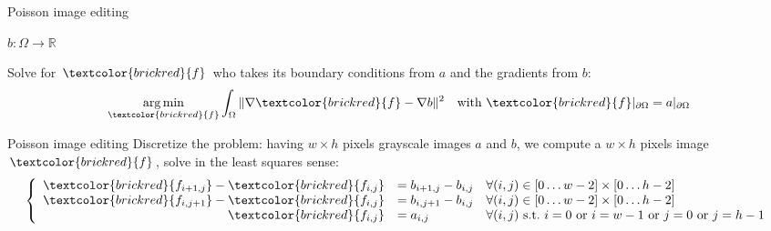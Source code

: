 \documentclass[UKenglish,aspectratio=169]{beamer}
\DeclareMathOperator*{\argmin}{arg\,min}
\newcommand\unknown[1]{\textcolor{brickred}{#1}}
\begin{document}
\begin{frame}{Poisson image editing}
\begin{minipage}{.12\linewidth}
$b:\Omega\rightarrow \mathbb R$
\end{minipage}
\qquad
\pause
\begin{minipage}{.6\linewidth}
Solve for $\unknown{f}$ who takes its boundary conditions from $a$ and the gradients from $b$:
$$
\argmin\limits_{\unknown{f}} \int_\Omega \|\nabla \unknown{f} - \nabla b\|^2 \quad \text{with~} \unknown{f}|_{\partial\Omega} = a|_{\partial\Omega}
$$
\end{minipage}
\end{frame}

\begin{frame}{Poisson image editing}
Discretize the problem: having $w \times h$ pixels grayscale images $a$ and $b$,
we compute a $w \times h$ pixels image $\unknown{f}$, solve in the least squares sense:
$$
\left \{ \begin{array}{rll}
\unknown{f_{i+1, j}}-\unknown{f_{i,j}} & = b_{i+1, j}-b_{i,j} & \forall (i,j) \in [0 \dots w-2] \times [0\dots h-2]\\
\unknown{f_{i, j+1}}-\unknown{f_{i,j}} & = b_{i, j+1}-b_{i,j} & \forall (i,j) \in [0 \dots w-2] \times [0\dots h-2]\\
\unknown{f_{i,j}}            & = a_{i,j}            & \forall (i,j) \text{~s.t.~} i=0 \text{~or~} i=w-1 \text{~or~} j=0 \text{~or~} j=h-1
\end{array} \right.
$$

\end{frame}
\end{document}
